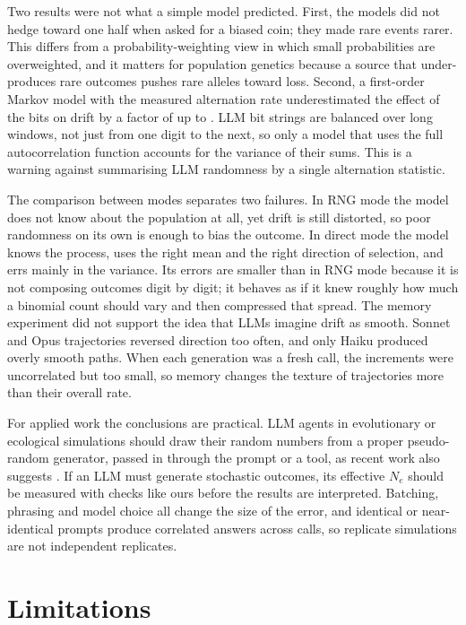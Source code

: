 \documentclass[11pt,a4paper]{article}
\newcommand{\Ne}{N_e}
\begin{document}
Two results were not what a simple model predicted.
First, the models did not hedge toward one half when asked for a biased coin; they made rare events rarer.
This differs from a probability-weighting view in which small probabilities are overweighted, and it matters for population genetics because a source that under-produces rare outcomes pushes rare alleles toward loss.
Second, a first-order Markov model with the measured alternation rate underestimated the effect of the bits on drift by a factor of up to \markovUnderFactor.
LLM bit strings are balanced over long windows, not just from one digit to the next, so only a model that uses the full autocorrelation function accounts for the variance of their sums.
This is a warning against summarising LLM randomness by a single alternation statistic.

The comparison between modes separates two failures.
In RNG mode the model does not know about the population at all, yet drift is still distorted, so poor randomness on its own is enough to bias the outcome.
In direct mode the model knows the process, uses the right mean and the right direction of selection, and errs mainly in the variance.
Its errors are smaller than in RNG mode because it is not composing outcomes digit by digit; it behaves as if it knew roughly how much a binomial count should vary and then compressed that spread.
The memory experiment did not support the idea that LLMs imagine drift as smooth.
Sonnet and Opus trajectories reversed direction too often, and only Haiku produced overly smooth paths.
When each generation was a fresh call, the increments were uncorrelated but too small, so memory changes the texture of trajectories more than their overall rate.

For applied work the conclusions are practical.
LLM agents in evolutionary or ecological simulations should draw their random numbers from a proper pseudo-random generator, passed in through the prompt or a tool, as recent work also suggests \citep{gu2026stochasticity}.
If an LLM must generate stochastic outcomes, its effective $\Ne$ should be measured with checks like ours before the results are interpreted.
Batching, phrasing and model choice all change the size of the error, and identical or near-identical prompts produce correlated answers across calls, so replicate simulations are not independent replicates.

\section{Limitations}
\end{document}
